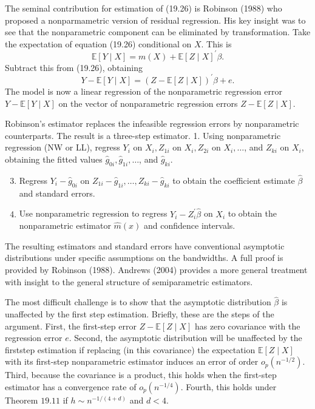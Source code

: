 \documentclass[10pt]{article}
\begin{document}
The seminal contribution for estimation of (19.26) is Robinson (1988) who proposed a nonparmametric version of residual regression. His key insight was to see that the nonparametric component can be eliminated by transformation. Take the expectation of equation (19.26) conditional on $X$. This is
$$
\mathbb{E}[Y \mid X]=m(X)+\mathbb{E}[Z \mid X]^{\prime} \beta .
$$
Subtract this from (19.26), obtaining
$$
Y-\mathbb{E}[Y \mid X]=(Z-\mathbb{E}[Z \mid X])^{\prime} \beta+e .
$$
The model is now a linear regression of the nonparametric regression error $Y-\mathbb{E}[Y \mid X]$ on the vector of nonparametric regression errors $Z-\mathbb{E}[Z \mid X]$.

Robinson's estimator replaces the infeasible regression errors by nonparametric counterparts. The result is a three-step estimator. 1. Using nonparametric regression (NW or LL), regress $Y_{i}$ on $X_{i}, Z_{1 i}$ on $X_{i}, Z_{2 i}$ on $X_{i}, \ldots$, and $Z_{k i}$ on $X_{i}$, obtaining the fitted values $\widehat{g}_{0 i}, \widehat{g}_{1 i}, \ldots$, and $\widehat{g}_{k i}$.

\begin{enumerate}
  \setcounter{enumi}{2}
  \item Regress $Y_{i}-\widehat{g}_{0 i}$ on $Z_{1 i}-\widehat{g}_{1 i}, \ldots, Z_{k i}-\widehat{g}_{k i}$ to obtain the coefficient estimate $\widehat{\beta}$ and standard errors.

  \item Use nonparametric regression to regress $Y_{i}-Z_{i}^{\prime} \widehat{\beta}$ on $X_{i}$ to obtain the nonparametric estimator $\widehat{m}(x)$ and confidence intervals.

\end{enumerate}
The resulting estimators and standard errors have conventional asymptotic distributions under specific assumptions on the bandwidths. A full proof is provided by Robinson (1988). Andrews (2004) provides a more general treatment with insight to the general structure of semiparametric estimators.

The most difficult challenge is to show that the asymptotic distribution $\widehat{\beta}$ is unaffected by the first step estimation. Briefly, these are the steps of the argument. First, the first-step error $Z-\mathbb{E}[Z \mid X]$ has zero covariance with the regression error $e$. Second, the asymptotic distribution will be unaffected by the firststep estimation if replacing (in this covariance) the expectation $\mathbb{E}[Z \mid X]$ with its first-step nonparametric estimator induces an error of order $o_{p}\left(n^{-1 / 2}\right)$. Third, because the covariance is a product, this holds when the first-step estimator has a convergence rate of $o_{p}\left(n^{-1 / 4}\right)$. Fourth, this holds under Theorem $19.11$ if $h \sim n^{-1 /(4+d)}$ and $d<4$.
\end{document}
